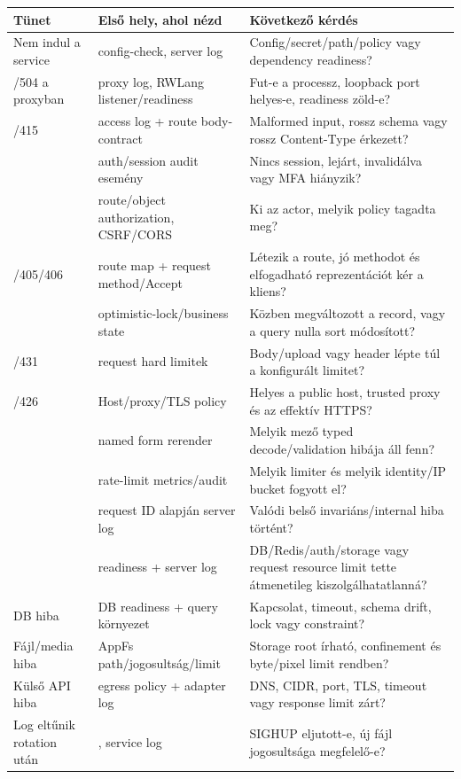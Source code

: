 \begin{longtable}{L{0.23\textwidth}L{0.30\textwidth}L{0.38\textwidth}}
\toprule
Tünet & Első hely, ahol nézd & Következő kérdés \\
\midrule
\endhead
Nem indul a service & config-check, server log & Config/secret/path/policy vagy dependency readiness? \\
/504 a proxyban & proxy log, RWLang listener/readiness & Fut-e a processz, loopback port helyes-e, readiness zöld-e? \\
/415 & access log + route body-contract & Malformed input, rossz schema vagy rossz Content-Type érkezett? \\
 & auth/session audit esemény & Nincs session, lejárt, invalidálva vagy MFA hiányzik? \\
 & route/object authorization, CSRF/CORS & Ki az actor, melyik policy tagadta meg? \\
/405/406 & route map + request method/Accept & Létezik a route, jó methodot és elfogadható reprezentációt kér a kliens? \\
 & optimistic-lock/business state & Közben megváltozott a record, vagy a  query nulla sort módosított? \\
/431 & request hard limitek & Body/upload vagy header lépte túl a konfigurált limitet? \\
/426 & Host/proxy/TLS policy & Helyes a public host, trusted proxy és az effektív HTTPS? \\
 & named form rerender & Melyik mező typed decode/validation hibája áll fenn? \\
 & rate-limit metrics/audit & Melyik limiter és melyik identity/IP bucket fogyott el? \\
 & request ID alapján server log & Valódi belső invariáns/internal hiba történt? \\
 & readiness + server log & DB/Redis/auth/storage vagy request resource limit tette átmenetileg kiszolgálhatatlanná? \\
\addlinespace
DB hiba & DB readiness + query környezet & Kapcsolat, timeout, schema drift, lock vagy constraint? \\
\addlinespace
Fájl/media hiba & AppFs path/jogosultság/limit & Storage root írható, confinement és byte/pixel limit rendben? \\
\addlinespace
Külső API hiba & egress policy + adapter log & DNS, CIDR, port, TLS, timeout vagy response limit zárt? \\
\addlinespace
Log eltűnik rotation után & , service log & SIGHUP eljutott-e, új fájl jogosultsága megfelelő-e? \\
\bottomrule
\end{longtable}

